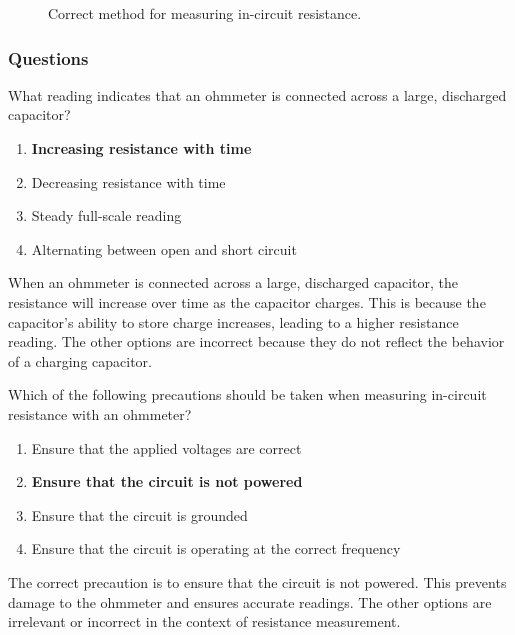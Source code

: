 \begin{figure}[h]
\centering
\caption{Correct method for measuring in-circuit resistance.}
\label{fig:ohmmeter-circuit}
\end{figure}

\subsubsection*{Questions}

\begin{tcolorbox}[colback=gray!10!white,colframe=black!75!black,title={T7D10}]
What reading indicates that an ohmmeter is connected across a large, discharged capacitor?
\begin{enumerate}[label=\Alph*),noitemsep]
    \item \textbf{Increasing resistance with time}
    \item Decreasing resistance with time
    \item Steady full-scale reading
    \item Alternating between open and short circuit
\end{enumerate}
\end{tcolorbox}

When an ohmmeter is connected across a large, discharged capacitor, the resistance will increase over time as the capacitor charges. This is because the capacitor's ability to store charge increases, leading to a higher resistance reading. The other options are incorrect because they do not reflect the behavior of a charging capacitor.

\begin{tcolorbox}[colback=gray!10!white,colframe=black!75!black,title={T7D11}]
Which of the following precautions should be taken when measuring in-circuit resistance with an ohmmeter?
\begin{enumerate}[label=\Alph*),noitemsep]
    \item Ensure that the applied voltages are correct
    \item \textbf{Ensure that the circuit is not powered}
    \item Ensure that the circuit is grounded
    \item Ensure that the circuit is operating at the correct frequency
\end{enumerate}
\end{tcolorbox}

The correct precaution is to ensure that the circuit is not powered. This prevents damage to the ohmmeter and ensures accurate readings. The other options are irrelevant or incorrect in the context of resistance measurement.
